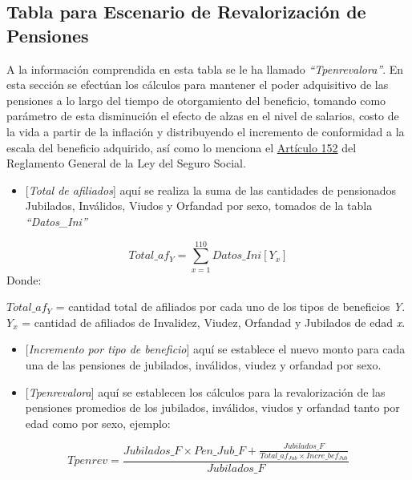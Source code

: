 \documentclass[
  letterpaper,
  DIV=11,
  numbers=noendperiod]{scrreprt}
\providecommand{\tightlist}{%
  \setlength{\itemsep}{0pt}\setlength{\parskip}{0pt}}\usepackage{longtable,booktabs,array}
\begin{document}
\hypertarget{tabla-para-escenario-de-revalorizaciuxf3n-de-pensiones}{%
\subsection{Tabla para Escenario de Revalorización de
Pensiones}\label{tabla-para-escenario-de-revalorizaciuxf3n-de-pensiones}}

A la información comprendida en esta tabla se le ha llamado
\emph{``Tpenrevalora''}. En esta sección se efectúan los cálculos para
mantener el poder adquisitivo de las pensiones a lo largo del tiempo de
otorgamiento del beneficio, tomando como parámetro de esta disminución
el efecto de alzas en el nivel de salarios, costo de la vida a partir de
la inflación y distribuyendo el incremento de conformidad a la escala
del beneficio adquirido, así como lo menciona el
\href{https://www.ilo.org/dyn/travail/docs/930/Reglamento\%20General\%20de\%20la\%20\%20Ley\%20del\%20IHSS.pdf}{Artículo
152} del Reglamento General de la Ley del Seguro Social.

\begin{itemize}
\tightlist
\item
  {[}\emph{Total de afiliados}{]} aquí se realiza la suma de las
  cantidades de pensionados Jubilados, Inválidos, Viudos y Orfandad por
  sexo, tomados de la tabla \emph{``Datos\_Ini''}
\end{itemize}

\[ 
Total\_af_{Y} =\sum_{x=1}^{110} Datos\_Ini[Y_x] 
\] Donde:

\(Total\_af_{Y}\) = cantidad total de afiliados por cada uno de los
tipos de beneficios \emph{Y}.\\
\(Y_x\) = cantidad de afiliados de Invalidez, Viudez, Orfandad y
Jubilados de edad \emph{x}.

\begin{itemize}
\item
  {[}\emph{Incremento por tipo de beneficio}{]} aquí se establece el
  nuevo monto para cada una de las pensiones de jubilados, inválidos,
  viudez y orfandad por sexo.
\item
  {[}\emph{Tpenrevalora}{]} aquí se establecen los cálculos para la
  revalorización de las pensiones promedios de los jubilados, inválidos,
  viudos y orfandad tanto por edad como por sexo, ejemplo:
\end{itemize}

\begin{equation} 
Tpenrev =\frac{Jubilados\_F \times Pen\_Jub\_F + \frac{Jubilados\_F}{Total\_af_{Jub} \times Incre\_bef_{Jub}}}{Jubilados\_F}
  \label{eq:Tpenrevalora}
\end{equation}
\end{document}
